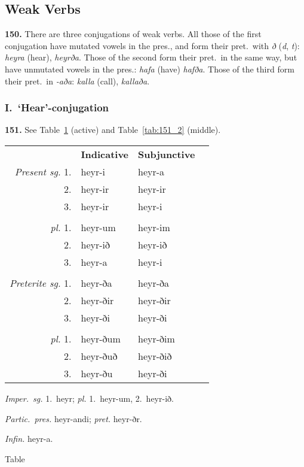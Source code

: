 \documentclass[12pt,letterpaper]{book}
\newcommand\newcaption{\small\refstepcounter{table}%
	\centering Table~\thetable}
\begin{document}
\subsection{Weak Verbs}

\textbf{150.} There are three conjugations of weak verbs.  All those of
the first conjugation have mutated vowels in the pres., and form
their pret.\ with \textit{ð} (\textit{d}, \textit{t}): \textit{heyra} (hear),
\textit{heyrða}.  Those of the second form their pret.\ in the same
way, but have unmutated vowels in the pres.: \textit{hafa} (have)
\textit{hafða}.  Those of the third form their pret.\ in \textit{-aða}:
\textit{kalla} (call), \textit{kallaða}.

\subsubsection{I.\ \textbf{`Hear'}-conjugation}

\textbf{151.}  See Table~\ref{tab:151_1} (active) and Table~\ref{tab:151_2}
(middle).

\begin{table}[htbp]
\begin{center}
\begin{tabular}{rlll}
    & \textbf{Indicative} & \textbf{Subjunctive} \\
    \textit{Present sg.} 1. & heyr-i & heyr-a \\
    2. & heyr-ir & heyr-ir \\
    3. & heyr-ir & heyr-i \\
    \\
    \textit{pl.} 1. & heyr-um & heyr-im \\
    2. & heyr-ið & heyr-ið \\
    3. & heyr-a & heyr-i \\
    \\
    \textit{Preterite sg.} 1. & heyr-ða & heyr-ða \\
    2. & heyr-ðir & heyr-ðir \\
    3. & heyr-ði & heyr-ði \\
    \\
    \textit{pl.} 1. & heyr-ðum & heyr-ðim \\
    2. & heyr-ðuð & heyr-ðið \\
    3. & heyr-ðu & heyr-ði \\
\end{tabular}
\end{center}

\begin{center}
\begin{minipage}{3in}
\textit{Imper.\ sg.} 1.\ heyr; \textit{pl.} 1.\ heyr-um, 2.\ heyr-ið.

\textit{Partic.\ pres.} heyr-andi; \textit{pret.} heyr-ðr.

\textit{Infin.} heyr-a.
\end{minipage}
\end{center}
\newcaption
\label{tab:151_1}
\end{table}
\end{document}
